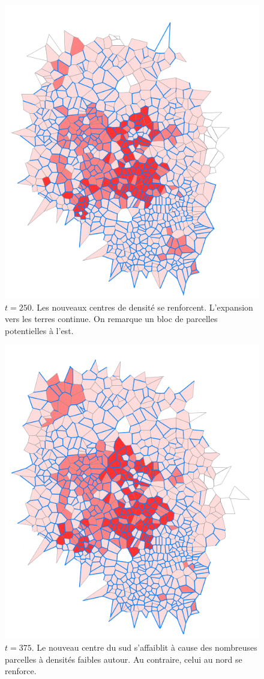 \documentclass[12pt]{article}
\begin{document}
\begin{figure}[H]
  \centering
  \includegraphics[width=.8\linewidth]{images/lh_250.png}
  \caption{$t = 250$. Les nouveaux centres de densité se
    renforcent. L'expansion vers les terres continue. On remarque un
    bloc de parcelles potentielles à l'est.}
\end{figure}

\begin{figure}[H]
  \centering
  \includegraphics[width=.8\linewidth]{images/lh_375.png}
  \caption{$t = 375$. Le nouveau centre du sud s'affaiblit à cause des
  nombreuses parcelles à densités faibles autour. Au contraire, celui
  au nord se renforce.}
\end{figure}
\end{document}
